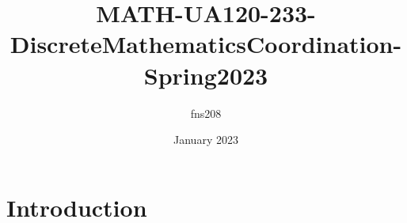 \documentclass{article}
\title{MATH-UA120-233-DiscreteMathematicsCoordination-Spring2023}
\author{fns208 }
\date{January 2023}
\begin{document}
\maketitle

\section{Introduction}
\end{document}
